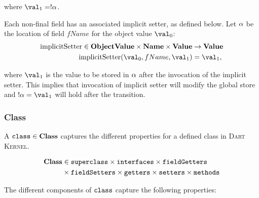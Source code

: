 \documentclass[a4paper,oneside]{article}
\newcommand{\kernel}{\textsc{Dart Kernel}}
\DeclareMathOperator{\setter}{implicitSetter}
\begin{document}
\noindent where $\val_1 = \deref{\loc}$.

Each non-final field has an associated implicit setter, as defined below.
Let $\alpha$ be the location of field $fName$ for the object value $\val_0$:
\begin{align*}
  \setter \in \dobjval \times \mathbf{Name} \times \dval &\rightarrow \dval\\
  \setter(\val_0, fName, \val_1) &= \val_1,
\end{align*}

\noindent where $\val_1$ is the value to be stored in $\alpha$ after the invocation of the implicit setter.
This implies that invocation of implicit setter will modify the global store and  $\deref{\loc} = \val_1$ will hold after the transition.


\subsubsection{Class}
\label{subsec:class}

A $\tt{class} \in \mathbf{Class}$ captures the different properties for a defined class in \kernel{}.

\begin{align}
\notag
\mathbf{Class} &\in \tt{superclass} \times \tt{interfaces} \times \tt{fieldGetters}\\\notag
&\times \tt{fieldSetters} \times \tt{getters} \times \tt{setters} \times \tt{methods}
\end{align}

The different components of $\tt{class}$ capture the following properties:
\end{document}
